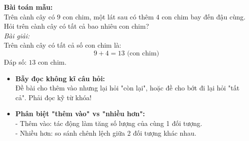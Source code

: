 \documentclass[11pt,a4paper]{article}
\begin{document}
\vspace{-1.5mm}
\noindent
\begin{minipage}[t]{0.49\textwidth}\vspace{0pt}
\begin{tcolorbox}[
  enhanced,
  colback=green!4!white,
  colframe=green!60!black,
  arc=2mm, boxrule=0.8pt,
  left=2mm, right=2mm, top=1.8mm, bottom=1.8mm,
  title={\footnotesize\bfseries\color{white}\faCheckCircle\ 4. Ví dụ thực hành chuẩn mực}
]
{\footnotesize
\textbf{Bài toán mẫu:}\\
Trên cành cây có $9$ con chim, một lát sau có thêm $4$ con chim bay đến đậu cùng. Hỏi trên cành cây có tất cả bao nhiêu con chim?\\
\textit{Bài giải:}\\
Trên cành cây có tất cả số con chim là:
$$9 + 4 = 13\text{ (con chim)}$$
Đáp số: $13$ con chim.
}
\end{tcolorbox}
\end{minipage}
\hfill
\begin{minipage}[t]{0.49\textwidth}\vspace{0pt}
\begin{tcolorbox}[
  enhanced,
  colback=red!4!white,
  colframe=red!75!black,
  arc=2mm, boxrule=0.8pt,
  left=2mm, right=2mm, top=1.8mm, bottom=1.8mm,
  title={\footnotesize\bfseries\color{white}\faExclamationTriangle\ 5. Mẹo tránh bẫy trắc nghiệm}
]
{\footnotesize
\begin{itemize}\setlength{\itemsep}{1pt}\setlength{\leftskip}{-2.5mm}
  \item \textbf{Bẫy đọc không kĩ câu hỏi:}\\
  Đề bài cho thêm vào nhưng lại hỏi "còn lại", hoặc đề cho bớt đi lại hỏi "tất cả". Phải đọc kỹ từ khóa!
  \item \textbf{Phân biệt "thêm vào" vs "nhiều hơn":}\\
  - Thêm vào: tác động làm tăng số lượng của cùng 1 đối tượng.\\
  - Nhiều hơn: so sánh chênh lệch giữa 2 đối tượng khác nhau.
\end{itemize}
}
\end{tcolorbox}
\end{minipage}
\end{document}
